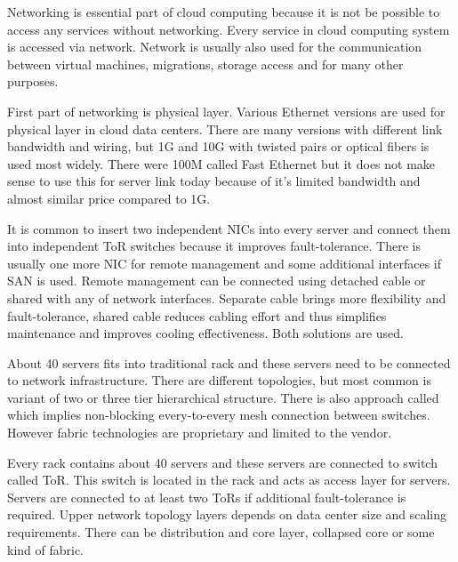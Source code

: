 

Networking is essential part of cloud computing because it is not be possible to access any services without networking. Every service in cloud computing system is accessed via network. Network is usually also used for the communication between virtual machines, migrations, storage access and for many other purposes.


First part of networking is physical layer. Various Ethernet versions are used for physical layer in cloud data centers. There are many versions with different link bandwidth and wiring, but 1G and 10G with twisted pairs or optical fibers is used most widely. There were 100M called Fast Ethernet but it does not make sense to use this for server link today because of it's limited bandwidth and almost similar price compared to 1G.

It is common to insert two independent \Ac{NIC}s into every server and connect them into independent \Ac{ToR} switches because it improves fault-tolerance. There is usually one more \Ac{NIC} for remote management and some additional interfaces if \Ac{SAN} is used. Remote management can be connected using detached cable or shared with any of network interfaces. Separate cable brings more flexibility and fault-tolerance, shared cable reduces cabling effort and thus simplifies maintenance and improves cooling effectiveness. Both solutions are used. 

About 40 servers fits into traditional rack and these servers need to be connected to network infrastructure. There are different topologies, but most common is variant of two or three tier hierarchical structure. \cite{survey-architectures} There is also approach called  which implies non-blocking every-to-every mesh connection between switches. However fabric technologies are proprietary and limited to the vendor. 

Every rack contains about 40 servers and these servers are connected to switch called \Ac{ToR}. This switch is located in the rack and acts as access layer for servers. Servers are connected to at least two \Ac{ToR}s if additional fault-tolerance is required. Upper network topology layers depends on data center size and scaling requirements. There can be distribution and core layer, collapsed core or some kind of fabric.


